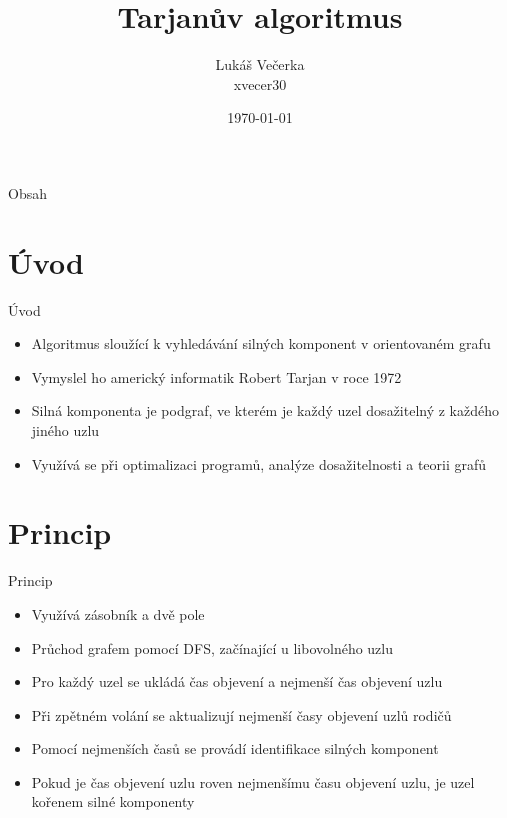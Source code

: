 \documentclass{beamer}
\title[Tarjanův algoritmus]{\huge Tarjanův algoritmus}
\author[Lukáš Večerka \\ xvecer30]{Lukáš Večerka \\ xvecer30}
\date{\today}
\begin{document}
\begin{frame}
    \maketitle
\end{frame}

\begin{frame}{Obsah}
\tableofcontents
\end{frame}

\section{Úvod}
\begin{frame}{Úvod}
    \begin{itemize}
        \item Algoritmus sloužící k vyhledávání silných komponent v orientovaném grafu
        \item Vymyslel ho americký informatik Robert Tarjan v roce 1972
        \item Silná komponenta je podgraf, ve kterém je každý uzel dosažitelný z každého jiného uzlu
        \item Využívá se při optimalizaci programů, analýze dosažitelnosti a teorii grafů
    \end{itemize}
\end{frame}

\section{Princip}
\begin{frame}{Princip}
    \begin{itemize}
        \item Využívá zásobník a dvě pole
        \item Průchod grafem pomocí DFS, začínající u libovolného uzlu
        \item Pro každý uzel se ukládá čas objevení a nejmenší čas objevení uzlu
        \item Při zpětném volání se aktualizují nejmenší časy objevení uzlů rodičů
        \item Pomocí nejmenších časů se provádí identifikace silných komponent
        \item Pokud je čas objevení uzlu roven nejmenšímu času objevení uzlu, je uzel kořenem silné komponenty
    \end{itemize}
\end{frame}
\end{document}
